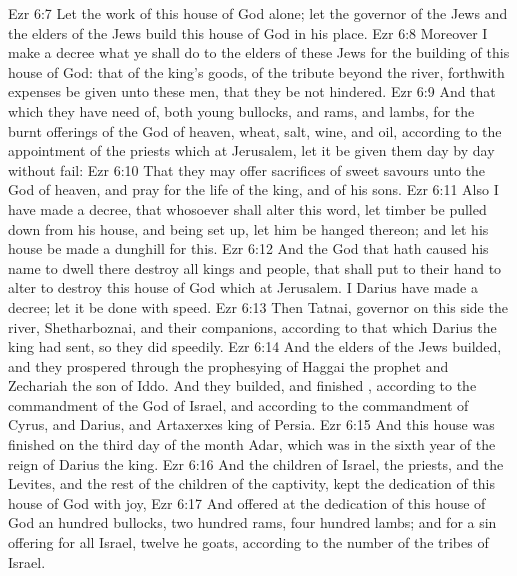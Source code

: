 \vs Ezr 6:7 Let the work of this house of God alone; let the governor of the Jews and the elders of the Jews build this house of God in his place.
\vs Ezr 6:8 Moreover I make a decree what ye shall do to the elders of these Jews for the building of this house of God: that of the king's goods,  of the tribute beyond the river, forthwith expenses be given unto these men, that they be not hindered.
\vs Ezr 6:9 And that which they have need of, both young bullocks, and rams, and lambs, for the burnt offerings of the God of heaven, wheat, salt, wine, and oil, according to the appointment of the priests which  at Jerusalem, let it be given them day by day without fail:
\vs Ezr 6:10 That they may offer sacrifices of sweet savours unto the God of heaven, and pray for the life of the king, and of his sons.
\vs Ezr 6:11 Also I have made a decree, that whosoever shall alter this word, let timber be pulled down from his house, and being set up, let him be hanged thereon; and let his house be made a dunghill for this.
\vs Ezr 6:12 And the God that hath caused his name to dwell there destroy all kings and people, that shall put to their hand to alter  to destroy this house of God which  at Jerusalem. I Darius have made a decree; let it be done with speed.
\vs Ezr 6:13 Then Tatnai, governor on this side the river, Shetharboznai, and their companions, according to that which Darius the king had sent, so they did speedily.
\vs Ezr 6:14 And the elders of the Jews builded, and they prospered through the prophesying of Haggai the prophet and Zechariah the son of Iddo. And they builded, and finished , according to the commandment of the God of Israel, and according to the commandment of Cyrus, and Darius, and Artaxerxes king of Persia.
\vs Ezr 6:15 And this house was finished on the third day of the month Adar, which was in the sixth year of the reign of Darius the king.
\vs Ezr 6:16 And the children of Israel, the priests, and the Levites, and the rest of the children of the captivity, kept the dedication of this house of God with joy,
\vs Ezr 6:17 And offered at the dedication of this house of God an hundred bullocks, two hundred rams, four hundred lambs; and for a sin offering for all Israel, twelve he goats, according to the number of the tribes of Israel.
